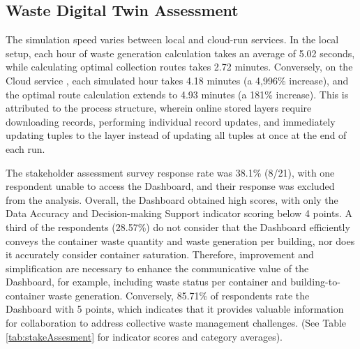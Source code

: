 \documentclass[authoryear,preprint,review,11pt,doubleblind]{elsarticle}
\begin{document}
    \subsection{Waste Digital Twin Assessment} \label{subsec:Assessment}
   The simulation speed varies between local and cloud-run services. In the local setup, each hour of waste generation calculation takes an average of 5.02 seconds, while calculating optimal collection routes takes 2.72 minutes. Conversely, on the Cloud service , each simulated hour takes 4.18 minutes (a 4,996\% increase), and the optimal route calculation extends to 4.93 minutes (a 181\% increase). This is attributed to the process structure, wherein online stored layers require downloading records, performing individual record updates, and immediately updating tuples to the layer instead of updating all tuples at once at the end of each run.

    The stakeholder assessment survey response rate was 38.1\% (8/21), with one respondent unable to access the Dashboard, and their response was excluded from the analysis. Overall, the Dashboard obtained high scores, with only the Data Accuracy and Decision-making Support indicator scoring below 4 points. A third of the respondents (28.57\%) do not consider that the Dashboard efficiently conveys the container waste quantity and waste generation per building, nor does it accurately consider container saturation. Therefore, improvement and simplification are necessary to enhance the communicative value of the Dashboard, for example, including waste status per container and building-to-container waste generation. Conversely,  85.71\% of respondents rate the Dashboard with 5 points, which indicates that it provides valuable information for collaboration to address collective waste management challenges. (See Table \ref{tab:stakeAssesment} for indicator scores and category averages).
\end{document}
